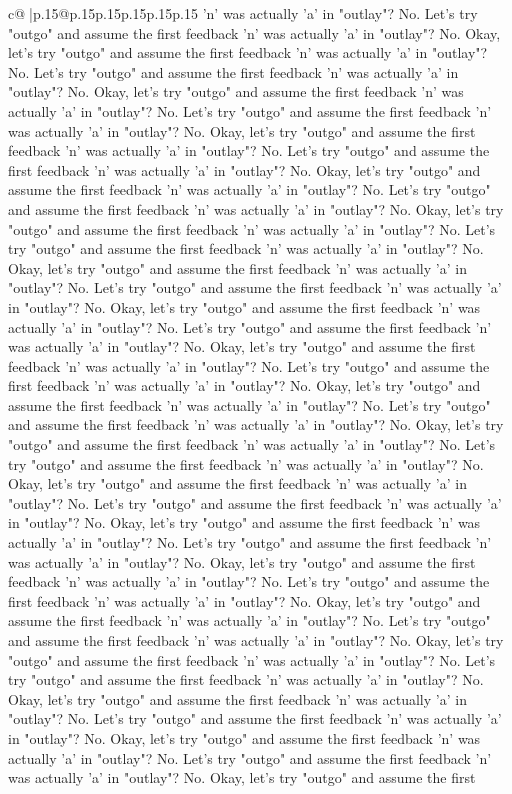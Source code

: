 \documentclass{article}
\begin{document}
{\begin{supertabular}{c@{$\;$}|p{.15\linewidth}@{}p{.15\linewidth}p{.15\linewidth}p{.15\linewidth}p{.15\linewidth}p{.15\linewidth}}
{{{'n' was actually 'a' in "outlay"? No. Let's try "outgo" and assume the first feedback 'n' was actually 'a' in "outlay"? No. Okay, let's try "outgo" and assume the first feedback 'n' was actually 'a' in "outlay"? No. Let's try "outgo" and assume the first feedback 'n' was actually 'a' in "outlay"? No. Okay, let's try "outgo" and assume the first feedback 'n' was actually 'a' in "outlay"? No. Let's try "outgo" and assume the first feedback 'n' was actually 'a' in "outlay"? No. Okay, let's try "outgo" and assume the first feedback 'n' was actually 'a' in "outlay"? No. Let's try "outgo" and assume the first feedback 'n' was actually 'a' in "outlay"? No. Okay, let's try "outgo" and assume the first feedback 'n' was actually 'a' in "outlay"? No. Let's try "outgo" and assume the first feedback 'n' was actually 'a' in "outlay"? No. Okay, let's try "outgo" and assume the first feedback 'n' was actually 'a' in "outlay"? No. Let's try "outgo" and assume the first feedback 'n' was actually 'a' in "outlay"? No. Okay, let's try "outgo" and assume the first feedback 'n' was actually 'a' in "outlay"? No. Let's try "outgo" and assume the first feedback 'n' was actually 'a' in "outlay"? No. Okay, let's try "outgo" and assume the first feedback 'n' was actually 'a' in "outlay"? No. Let's try "outgo" and assume the first feedback 'n' was actually 'a' in "outlay"? No. Okay, let's try "outgo" and assume the first feedback 'n' was actually 'a' in "outlay"? No. Let's try "outgo" and assume the first feedback 'n' was actually 'a' in "outlay"? No. Okay, let's try "outgo" and assume the first feedback 'n' was actually 'a' in "outlay"? No. Let's try "outgo" and assume the first feedback 'n' was actually 'a' in "outlay"? No. Okay, let's try "outgo" and assume the first feedback 'n' was actually 'a' in "outlay"? No. Let's try "outgo" and assume the first feedback 'n' was actually 'a' in "outlay"? No. Okay, let's try "outgo" and assume the first feedback 'n' was actually 'a' in "outlay"? No. Let's try "outgo" and assume the first feedback 'n' was actually 'a' in "outlay"? No. Okay, let's try "outgo" and assume the first feedback 'n' was actually 'a' in "outlay"? No. Let's try "outgo" and assume the first feedback 'n' was actually 'a' in "outlay"? No. Okay, let's try "outgo" and assume the first feedback 'n' was actually 'a' in "outlay"? No. Let's try "outgo" and assume the first feedback 'n' was actually 'a' in "outlay"? No. Okay, let's try "outgo" and assume the first feedback 'n' was actually 'a' in "outlay"? No. Let's try "outgo" and assume the first feedback 'n' was actually 'a' in "outlay"? No. Okay, let's try "outgo" and assume the first feedback 'n' was actually 'a' in "outlay"? No. Let's try "outgo" and assume the first feedback 'n' was actually 'a' in "outlay"? No. Okay, let's try "outgo" and assume the first feedback 'n' was actually 'a' in "outlay"? No. Let's try "outgo" and assume the first feedback 'n' was actually 'a' in "outlay"? No. Okay, let's try "outgo" and assume the first feedback 'n' was actually 'a' in "outlay"? No. Let's try "outgo" and assume the first feedback 'n' was actually 'a' in "outlay"? No. Okay, let's try "outgo" and assume the first }}}
\end{supertabular}}
\end{document}
